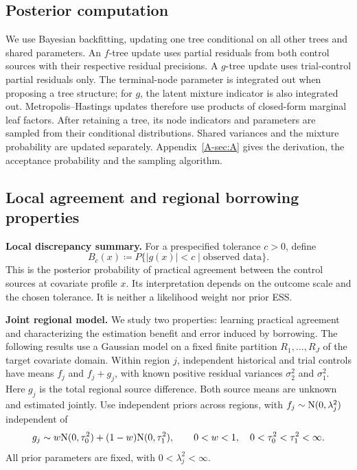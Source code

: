 \documentclass[11pt]{article}
\begin{document}
\subsection{Posterior computation}
We use Bayesian backfitting, updating one tree conditional on all other trees and shared parameters. An $f$-tree update uses partial residuals from both control sources with their respective residual precisions. A $g$-tree update uses trial-control partial residuals only. The terminal-node parameter is integrated out when proposing a tree structure; for $g$, the latent mixture indicator is also integrated out. Metropolis--Hastings updates therefore use products of closed-form marginal leaf factors. After retaining a tree, its node indicators and parameters are sampled from their conditional distributions. Shared variances and the mixture probability are updated separately. Appendix~\ref{A-sec:A} gives the derivation, the acceptance probability and the sampling algorithm.

\subsection{Local agreement and regional borrowing properties}
\noindent\textbf{Local discrepancy summary.}
For a prespecified tolerance $c>0$, define
\begin{equation}\label{eq:local}
B_c(x)\coloneqq P\{|g(x)|<c\mid\text{observed data}\}.
\end{equation}
This is the posterior probability of practical agreement between the control sources at covariate profile $x$. Its interpretation depends on the outcome scale and the chosen tolerance. It is neither a likelihood weight nor prior ESS.

\noindent\textbf{Joint regional model.}
We study two properties: learning practical agreement and characterizing the estimation benefit and error induced by borrowing. The following results use a Gaussian model on a fixed finite partition $R_1,\ldots,R_J$ of the target covariate domain. Within region $j$, independent historical and trial controls have means $f_j$ and $f_j+g_j$, with known positive residual variances $\sigma_2^2$ and $\sigma_1^2$. Here $g_j$ is the total regional source difference. Both source means are unknown and estimated jointly. Use independent priors across regions, with $f_j\sim\mathrm{N}(0,\lambda_j^2)$ independent of
\[
g_j\sim w\mathrm{N}(0,\tau_0^2)+(1-w)\mathrm{N}(0,\tau_1^2),
\qquad 0<w<1,\quad 0<\tau_0^2<\tau_1^2<\infty.
\]
All prior parameters are fixed, with $0<\lambda_j^2<\infty$.
\end{document}
